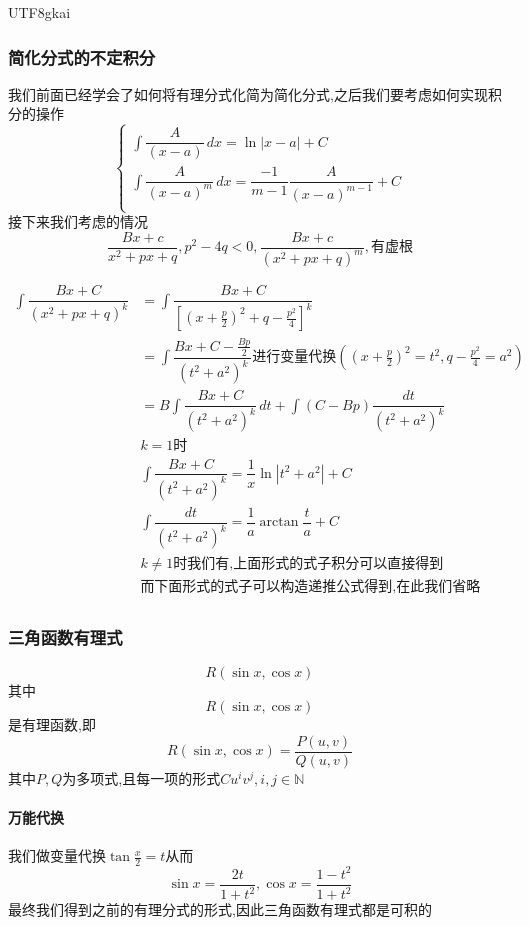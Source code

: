 \documentclass{article}
\newcommand{\NN}{\mathbb{N}}
\begin{document}
\begin{CJK}{UTF8}{gkai}
\subsubsection{简化分式的不定积分}

我们前面已经学会了如何将有理分式化简为简化分式,之后我们要考虑如何实现积分的操作\\
\begin{equation*}
  \begin{cases}
    \int\dfrac{A}{(x-a)}\,dx = \ln|x-a| + C\\
    \int\dfrac{A}{(x-a)^m}\,dx = \dfrac{-1}{m-1}\dfrac{A}{(x-a)^{m-1}} + C\\
  \end{cases}
\end{equation*}
接下来我们考虑的情况
\[\dfrac{Bx + c}{x^2 + px + q},p^2 - 4q < 0,\dfrac{Bx + c}{(x^2 + px + q)^m},\text{有虚根}\]

\[
\begin{aligned}  
\int\dfrac{Bx + C}{(x^2 + px + q)^k}&=\int\dfrac{Bx + C}{[(x+\frac{p}{2})^2 + q - \frac{p^2}{4}]^k}\\
&=\int\dfrac{Bx + C - \frac{Bp}{2}}{(t^2 + a^2)^k}\text{进行变量代换}((x+\frac{p}{2})^2 = t^2 ,q - \frac{p^2}{4} = a^2 )\\
&=B\int \dfrac{Bx + C}{(t^2 + a^2)^k}\, dt + \int(C - Bp)\dfrac{dt}{(t^2 + a^2)^k}\\
&k = 1\text{时}\\
&\int \dfrac{Bx + C}{(t^2 + a^2)^k} = \dfrac{1}{x}\ln|t^2 + a^2 | + C\\
&\int \dfrac{dt}{(t^2 + a^2)^k}=\dfrac{1}{a}\arctan \dfrac{t}{a} + C\\
&k \neq 1\text{时我们有,上面形式的式子积分可以直接得到}\\
&\text{而下面形式的式子可以构造递推公式得到,在此我们省略}\\
\end{aligned}
\]
\subsubsection{三角函数有理式}
\[R(\sin x,\cos x)\]
其中\[R(\sin x,\cos x)\]是有理函数,即\[R(\sin x,\cos x) =\dfrac{P(u,v)}{Q(u,v)}\]
其中$P,Q$为多项式,且每一项的形式$Cu^i v^j,i,j\in \NN$\\
\paragraph{万能代换}
我们做变量代换$\tan \frac{x}{2} = t$从而
\[\sin x = \dfrac{2t}{1 + t^2},\cos x =  \dfrac{1-t^2}{1+t^2}\]
最终我们得到之前的有理分式的形式,因此三角函数有理式都是可积的\\


\end{CJK}
\end{document}
